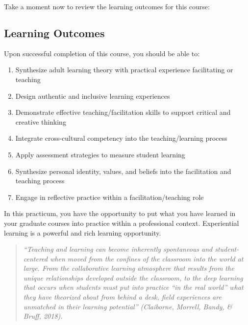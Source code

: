 \documentclass[
]{book}
\providecommand{\tightlist}{%
  \setlength{\itemsep}{0pt}\setlength{\parskip}{0pt}}
\begin{document}
Take a moment now to review the learning outcomes for this course:

\hypertarget{learning-outcomes-1}{%
\subsection*{Learning Outcomes}\label{learning-outcomes-1}}

Upon successful completion of this course, you should be able to:

\begin{enumerate}
\def\labelenumi{\arabic{enumi}.}
\tightlist
\item
  Synthesize adult learning theory with practical experience facilitating or teaching\\
\item
  Design authentic and inclusive learning experiences\\
\item
  Demonstrate effective teaching/facilitation skills to support critical and creative thinking\\
\item
  Integrate cross-cultural competency into the teaching/learning process\\
\item
  Apply assessment strategies to measure student learning\\
\item
  Synthesize personal identity, values, and beliefs into the facilitation and teaching process\\
\item
  Engage in reflective practice within a facilitation/teaching role
\end{enumerate}

In this practicum, you have the opportunity to put what you have learned in your graduate courses into practice within a professional context. Experiential learning is a powerful and rich learning opportunity.

\begin{quote}
\emph{``Teaching and learning can become inherently spontaneous and student-centered when moved from the confines of the classroom into the world at large. From the collaborative learning atmosphere that results from the unique relationships developed outside the classroom, to the deep learning that occurs when students must put into practice ``in the real world'' what they have theorized about from behind a desk, field experiences are unmatched in their learning potential'' (Claiborne, Morrell, Bandy, \& Bruff, 2018).}
\end{quote}
\end{document}
